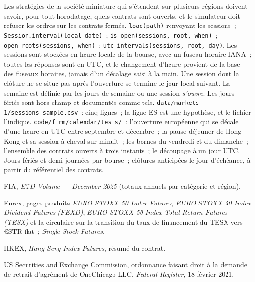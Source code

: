 \begin{build}
 Les stratégies de la société miniature qui s'étendent sur plusieurs régions
doivent savoir, pour tout horodatage, quels contrats sont ouverts, et le simulateur doit
refuser les ordres sur les contrats fermés.
 \texttt{load(path)} renvoyant les sessions~;
\texttt{Session.interval(local\_date)}~; \texttt{is\_open(sessions, root,
when)}~; \texttt{open\_roots(sessions, when)}~; \texttt{utc\_intervals(sessions,
root, day)}.
 Les sessions sont stockées en heure locale de la bourse, avec un fuseau
horaire IANA~; toutes les réponses sont en UTC, et le changement d'heure provient de la base
des fuseaux horaires, jamais d'un décalage saisi à la main. Une session dont la clôture ne
se situe pas après l'ouverture se termine le jour local suivant. La semaine est définie par les
jours de semaine où une session \emph{s'ouvre}. Les jours fériés sont hors champ et documentés comme tels.
 \texttt{data/markets-1/sessions\_sample.csv}~: cinq lignes~; la
ligne ES est une hypothèse, et le fichier l'indique.
 \texttt{code/firm/calendar/tests/}~: l'ouverture européenne qui
se décale d'une heure en UTC entre septembre et décembre~; la pause déjeuner de Hong Kong et sa
session à cheval sur minuit~; les bornes du vendredi et du dimanche~; l'ensemble des contrats
ouverts à trois instants~; le découpage à un jour UTC.
 Jours fériés et demi-journées par bourse~; clôtures anticipées
le jour d'échéance, à partir du référentiel des contrats.
\end{build}

\begin{omsources}
\item FIA, \emph{ETD Volume --- December 2025} (totaux annuels par catégorie et
région).
\item Eurex, pages produits \emph{EURO STOXX 50 Index Futures}, \emph{EURO
STOXX 50 Index Dividend Futures (FEXD)}, \emph{EURO STOXX 50 Index Total
Return Futures (TESX)} et la circulaire sur la transition du taux de financement du TESX vers
\euro STR flat~; \emph{Single Stock Futures}.
\item HKEX, \emph{Hang Seng Index Futures}, résumé du contrat.
\item US Securities and Exchange Commission, ordonnance faisant droit à la demande de retrait
d'agrément de OneChicago LLC, \emph{Federal Register}, 18 février
2021.
\end{omsources}


